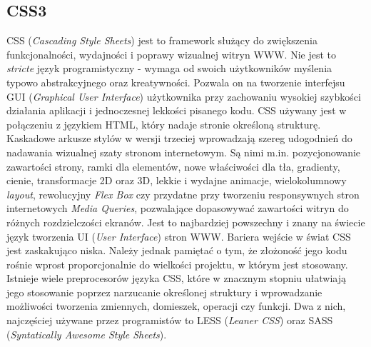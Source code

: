 \subsection{CSS3}
CSS (\textit{Cascading Style Sheets}) jest to framework służący do zwiększenia funkcjonalności, wydajności i poprawy wizualnej witryn WWW. Nie jest to \textit{stricte} język programistyczny - wymaga od swoich użytkowników myślenia typowo abstrakcyjnego oraz kreatywności. Pozwala on na tworzenie interfejsu GUI (\textit{Graphical User Interface}) użytkownika przy zachowaniu wysokiej szybkości działania aplikacji i jednoczesnej lekkości pisanego kodu. CSS używany jest w połączeniu z językiem HTML, który nadaje stronie określoną strukturę. Kaskadowe arkusze stylów w wersji trzeciej wprowadzają szereg udogodnień do nadawania wizualnej szaty stronom internetowym. Są nimi m.in. pozycjonowanie zawartości strony, ramki dla elementów, nowe właściwości dla tła, gradienty, cienie, transformacje 2D oraz 3D, lekkie i wydajne animacje, wielokolumnowy \textit{layout}, rewolucyjny \textit{Flex Box} czy przydatne przy tworzeniu responsywnych stron internetowych \textit{Media Queries}, pozwalające dopasowywać zawartości witryn do różnych rozdzielczości ekranów. Jest to najbardziej powszechny i znany na świecie język tworzenia UI (\textit{User Interface}) stron WWW. Bariera wejście w świat CSS jest zaskakująco niska. Należy jednak pamiętać o tym, że złożoność jego kodu rośnie wprost proporcjonalnie do wielkości projektu, w którym jest stosowany. Istnieje wiele preprocesorów języka CSS, które w znacznym stopniu ułatwiają jego stosowanie poprzez narzucanie określonej struktury i wprowadzanie możliwości tworzenia zmiennych, domieszek, operacji czy funkcji. Dwa z nich, najczęściej używane przez programistów to LESS (\textit{Leaner CSS}) oraz SASS (\textit{Syntatically Awesome Style Sheets}). \cite{Css}

